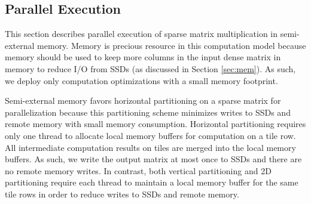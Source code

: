 
\subsection{Parallel Execution} \label{sec:exec}
This section describes parallel execution of sparse matrix multiplication
in semi-external memory. Memory is precious resource in this computation model
because memory should be used to keep more columns in the input dense matrix
in memory to reduce I/O from SSDs (as discussed in Section \ref{sec:mem}).
As such, we deploy only computation optimizations with a small memory footprint.

Semi-external memory favors horizontal partitioning on a sparse matrix
for parallelization because this partitioning scheme minimizes writes to SSDs
and remote memory with small memory consumption. Horizontal partitioning
requires only one thread to allocate local memory buffers for computation on
a tile row. All intermediate computation results on tiles are merged into
the local memory buffers. As such, we write the output matrix at most once
to SSDs and there are no remote memory writes.
In contrast, both vertical partitioning and 2D partitioning require each
thread to maintain a local memory buffer for the same tile rows in order
to reduce writes to SSDs and remote memory.

